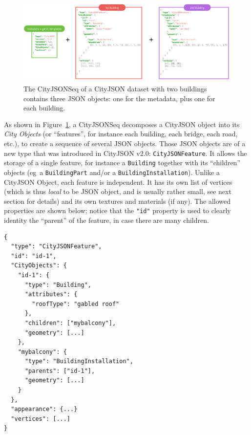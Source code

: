 \documentclass{isprs} %
\newcommand{\eg}{eg}
\begin{document}
\begin{figure}[h]
  \centering
  \includegraphics[width=0.95\linewidth]{figs/cjseq_idea}
  \caption{The CityJSONSeq of a CityJSON dataset with two buildings contains three JSON objects: one for the metadata, plus one for each building.}%
\label{fig:cjseq_idea}
\end{figure}

As shown in Figure~\ref{fig:cjseq_idea}, a CityJSONSeq decomposes a CityJSON object into its \emph{City Objects} (or ``features'', for instance each building, each bridge, each road, etc.), to create a sequence of several JSON objects.
Those JSON objects are of a new type that was introduced in CityJSON v2.0: \texttt{CityJSONFeature}.
It allows the storage of a single feature, for instance a \texttt{Building} together with its ``children'' objects (\eg\ a \texttt{BuildingPart} and/or a \texttt{BuildingInstallation}). 
Unlike a CityJSON Object, each feature is independent. 
It has its own list of vertices (which is thus \emph{local} to be JSON object, and is usually rather small, see next section for details) and its own textures and materials (if any).
The allowed properties are shown below; notice that the \texttt{"id"} property is used to clearly identity the ``parent'' of the feature, in case there are many children.
\begin{lstlisting}
{
  "type": "CityJSONFeature",
  "id": "id-1", 
  "CityObjects": {
    "id-1": {
      "type": "Building", 
      "attributes": { 
        "roofType": "gabled roof"
      },
      "children": ["mybalcony"],
      "geometry": [...]
    },
    "mybalcony": {
      "type": "BuildingInstallation", 
      "parents": ["id-1"],
      "geometry": [...]
    }
  },
  "appearance": {...}
  "vertices": [...]
}
\end{lstlisting}

%
\end{document}
